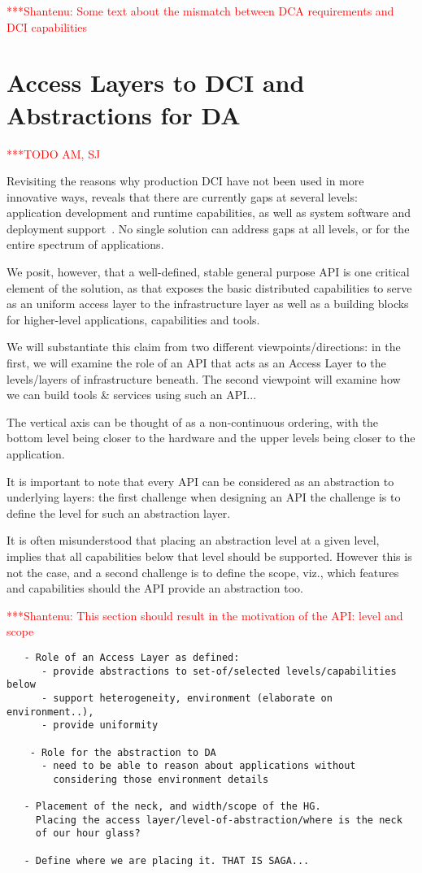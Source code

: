 \documentclass[a4paper,10pt]{article}
\newcommand{\todo}[1]{     {\textcolor{red}  { ***TODO      #1 }}}
\newcommand{\jhanote}[1]{  {\textcolor{red}  { ***Shantenu: #1 }}}
\newcommand{\todo}[1]{}
\newcommand{\jhanote}[1]{}
\begin{document}
 \jhanote{Some text about the mismatch between DCA requirements and
  DCI capabilities}

\section{Access Layers to DCI and Abstractions for DA}\todo{AM, SJ}

Revisiting the reasons why production DCI have not been used in more
innovative ways, reveals that there are currently gaps at several
levels: application development and runtime capabilities, as well as
system software and deployment support~\cite{dpagrid2009}.  No single
solution can address gaps at all levels, or for the entire spectrum of
applications.  

We posit, however, that a well-defined, stable general purpose API is
one critical element of the solution, as that exposes the basic
distributed capabilities to serve as an uniform access layer to the
infrastructure layer as well as a building blocks for higher-level
applications, capabilities and tools.

We will substantiate this claim from two different
viewpoints/directions: in the first, we will examine the role of an
API that acts as an Access Layer to the levels/layers of
infrastructure beneath. The second viewpoint will examine how we can
build tools \& services using such an API...

The vertical axis can be thought of as a non-continuous ordering, with
the bottom level being closer to the hardware and the upper levels
being closer to the application.

It is important to note that every API can be considered as an
abstraction to underlying layers: the first challenge when designing
an API the challenge is to define the level for such an abstraction
layer.  

It is often misunderstood that placing an abstraction level at a given
level, implies that all capabilities below that level should be
supported. However this is not the case, and a second challenge is to
define the scope, viz., which features and capabilities should the API
provide an abstraction too.

\jhanote{This section should result in the motivation of the API:
  level and scope}


\begin{verbatim}
   - Role of an Access Layer as defined:
      - provide abstractions to set-of/selected levels/capabilities below
      - support heterogeneity, environment (elaborate on environment..), 
      - provide uniformity

    - Role for the abstraction to DA 
      - need to be able to reason about applications without 
        considering those environment details

   - Placement of the neck, and width/scope of the HG.
     Placing the access layer/level-of-abstraction/where is the neck
     of our hour glass?

   - Define where we are placing it. THAT IS SAGA...
\end{verbatim}
\end{document}
